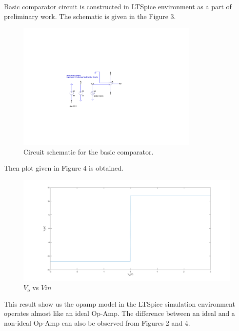 \documentclass[letterpaper,12pt]{article}
\begin{document}
Basic comparator circuit is constructed in LTSpice environment as a part of preliminary work. The schematic is given in the Figure 3.
\begin{figure}[H]
	\centering
   \includegraphics[width=0.8\textwidth]{BasicComparator_SCH.pdf}
   \caption{Circuit schematic for the basic comparator.}
\end{figure} 
Then plot given in Figure 4 is obtained.

\begin{figure}[H]
	\centering
   \includegraphics[width=1\textwidth]{3a_vs_vin.png}
   \caption{\(V_o\) vs \(V{in}\)}
\end{figure}
This result show us the opamp model in the LTSpice simulation environment operates almost like an ideal Op-Amp. The difference between an ideal and a non-ideal Op-Amp can also be observed from Figures 2  and 4.
\end{document}
